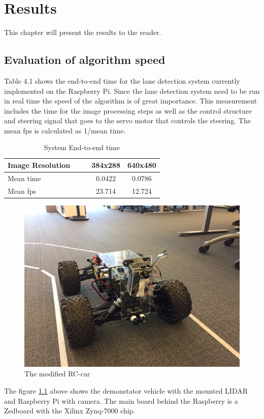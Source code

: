 \chapter{Results}
\label{sec:results}

This chapter will present the results to the reader.


\section{Evaluation of algorithm speed}
Table 4.1 shows the end-to-end time for the lane detection system currently implemented on the Raspberry Pi. Since the lane detection system need to be run in real time the speed of the algorithm is of great importance. This measurement includes the time for the image processing steps as well as the control structure and steering signal that goes to the servo motor that controls the steering. The mean fps is calculated as 1/mean time.


\begin{table}[H]
\centering
\caption{System End-to-end time}
\label{End-to-end time}
\begin{tabular}{@{} l *4c @{}}
\toprule
Image Resolution   & & & 384x288 & 640x480  \\ 
\midrule
 Mean time & & & 0.0422 & 0.0786 \\ 
 Mean fps & & & 23.714 & 12.724 \\
\bottomrule
 \end{tabular}
\end{table}



\begin{figure}[H]
  \includegraphics[width=\textwidth]{./img/utor.JPG}
  \centering
  \caption{The modified RC-car}
  \label{fig:The modified RC-car used for demonstrator}
\end{figure}

The figure \ref{fig:The modified RC-car used for demonstrator} above shows the demonstator vehicle with the mounted LIDAR and Raspberry Pi with camera. The main board behind the Raspberry is a Zedboard with the Xilinx Zynq-7000 chip.